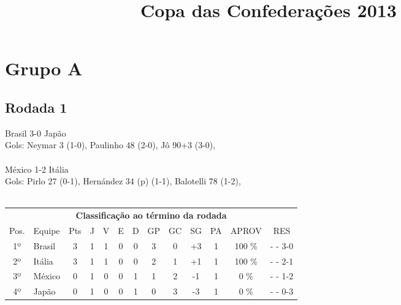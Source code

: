 \documentclass{article}
\title{\textbf{Copa das Confederações 2013}}
\author{}
\date{}
\begin{document}
\maketitle

\section*{Grupo A}
\subsection*{Rodada 1}
Brasil 3-0 Japão\\
Gols: Neymar 3 (1-0), Paulinho 48 (2-0), Jô 90+3 (3-0), \\
\\
México 1-2 Itália\\
Gols: Pirlo 27 (0-1), Hernández 34 (p) (1-1), Balotelli 78 (1-2), \\
\\
\begin{center}
\begin{tabular}{| c | l | c | c | c | c | c | c | c | c | c | c | c |}
\multicolumn{13}{c}{\textbf{Classificação ao término da rodada}}\\
Pos.&Equipe&Pts&J&V&E&D&GP&GC&SG&PA&APROV&RES\\
1º&Brasil              &3&1	&1&0&0	&3&0&+3	&1&100 \%	& -  - 3-0 \\
2º&Itália              &3&1	&1&0&0	&2&1&+1	&1&100 \%	& -  - 2-1 \\
3º&México              &0&1	&0&0&1	&1&2&-1	&1&  0 \%	& -  - 1-2 \\
4º&Japão               &0&1	&0&0&1	&0&3&-3	&1&  0 \%	& -  - 0-3 \\
\end{tabular}
\end{center}
\end{document}
